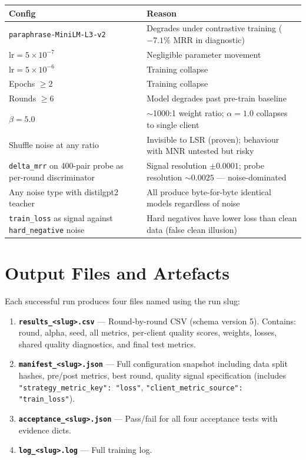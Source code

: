 \documentclass[12pt,a4paper]{article}
\begin{document}
\begin{center}
\renewcommand{\arraystretch}{1.4}
\begin{tabular}{lp{9cm}}
\toprule
\textbf{Config} & \textbf{Reason} \\
\midrule
\texttt{paraphrase-MiniLM-L3-v2} & Degrades under contrastive training ($-7.1\%$ MRR in diagnostic) \\
$\text{lr}=5\times10^{-7}$ & Negligible parameter movement \\
$\text{lr}=5\times10^{-6}$ & Training collapse \\
Epochs $\geq 2$ & Training collapse \\
Rounds $\geq 6$ & Model degrades past pre-train baseline \\
$\beta=5.0$ & $\sim$1000:1 weight ratio; $\alpha=1.0$ collapses to single client \\
Shuffle noise at any ratio & Invisible to LSR (proven); behaviour with MNR untested but risky \\
\texttt{delta\_mrr} on 400-pair probe as per-round discriminator & Signal resolution $\pm 0.0001$; probe resolution $\sim 0.0025$ --- noise-dominated \\
Any noise type with distilgpt2 teacher & All produce byte-for-byte identical models regardless of noise \\
\texttt{train\_loss} as signal against \texttt{hard\_negative} noise & Hard negatives have lower loss than clean data (false clean illusion) \\
\bottomrule
\end{tabular}
\end{center}

\section{Output Files and Artefacts}

Each successful run produces four files named using the run slug:

\begin{enumerate}
  \item \textbf{\texttt{results\_<slug>.csv}} --- Round-by-round CSV (schema version 5). Contains: round, alpha, seed, all metrics, per-client quality scores, weights, losses, shared quality diagnostics, and final test metrics.
  \item \textbf{\texttt{manifest\_<slug>.json}} --- Full configuration snapshot including data split hashes, pre/post metrics, best round, quality signal specification (includes \texttt{"strategy\_metric\_key": "loss"}, \texttt{"client\_metric\_source": "train\_loss"}).
  \item \textbf{\texttt{acceptance\_<slug>.json}} --- Pass/fail for all four acceptance tests with evidence dicts.
  \item \textbf{\texttt{log\_<slug>.log}} --- Full training log.
\end{enumerate}
\end{document}
